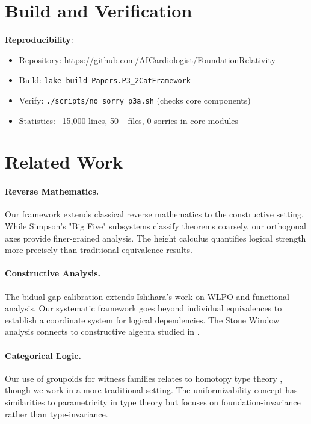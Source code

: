 \documentclass[11pt]{article}
\theoremstyle{plain}
\theoremstyle{definition}
\begin{document}
\section{Build and Verification}

\begin{formalbox}
\textbf{Reproducibility}:
\begin{itemize}
\item Repository: \url{https://github.com/AICardiologist/FoundationRelativity}
\item Build: \texttt{lake build Papers.P3\_2CatFramework}
\item Verify: \texttt{./scripts/no\_sorry\_p3a.sh} (checks core components)
\item Statistics: ~15,000 lines, 50+ files, 0 sorries in core modules
\end{itemize}
\end{formalbox}

\section{Related Work}

\paragraph{Reverse Mathematics.} Our framework extends classical reverse mathematics \cite{Simpson2009} to the constructive setting. While Simpson's "Big Five" subsystems classify theorems coarsely, our orthogonal axes provide finer-grained analysis. The height calculus quantifies logical strength more precisely than traditional equivalence results.

\paragraph{Constructive Analysis.} The bidual gap calibration extends Ishihara's work \cite{Ishihara2006} on WLPO and functional analysis. Our systematic framework goes beyond individual equivalences to establish a coordinate system for logical dependencies. The Stone Window analysis connects to constructive algebra studied in \cite{MinesRichmanRuitenburg1988}.

\paragraph{Categorical Logic.} Our use of groupoids for witness families relates to homotopy type theory \cite{HoTTBook}, though we work in a more traditional setting. The uniformizability concept has similarities to parametricity in type theory but focuses on foundation-invariance rather than type-invariance.
\end{document}
